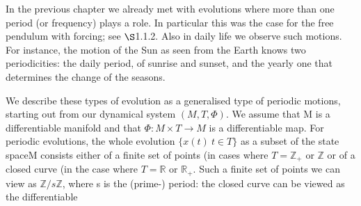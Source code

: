 \documentclass{article}
\begin{document}
\hfill

In the previous chapter we already met with evolutions where more than one period
(or frequency) plays a role. In particular this was the case for the free pendulum
with forcing; see $\S$1.1.2. Also in daily life we observe such motions. For instance,
the motion of the Sun as seen from the Earth knows two periodicities: the daily
period, of sunrise and sunset, and the yearly one that determines the change of the
seasons.

\hfill

We describe these types of evolution as a generalised type of periodic motions,
starting out from our dynamical system $(M, T, \Phi)$. We assume that M is a differentiable
manifold and that $\Phi: M \times T \to M$ is a differentiable map. For periodic
evolutions, the whole evolution $\{ x(t) \ t \in T \}$ as a subset of the state spaceM consists
either of a finite set of points (in cases where $T = \mathbb{Z}_{+}$ or $\mathbb{Z}$ or of a closed curve
(in the case where $T = \mathbb{R}$ or $\mathbb{R}_{+}$. Such a finite set of points we can view as $\mathbb{Z}/s\mathbb{Z}$,
where s is the (prime-) period: the closed curve can be viewed as the differentiable
\end{document}
